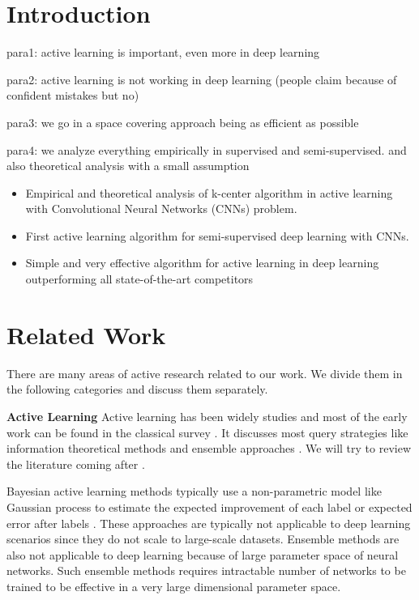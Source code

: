 \documentclass{article}
\begin{document}
\section{Introduction}
para1: active learning is important, even more in deep learning

para2: active learning is not working in deep learning (people claim because of confident mistakes but no)

para3: we go in a space covering approach being as efficient as possible

para4: we analyze everything empirically in supervised and semi-supervised. and also theoretical analysis with a small assumption

\begin{itemize}
\item Empirical and theoretical analysis of k-center algorithm in active learning with Convolutional Neural Networks (CNNs) problem.
\item First active learning algorithm for semi-supervised deep learning with CNNs.
\item Simple and very effective algorithm for active learning in deep learning outperforming all state-of-the-art competitors
\end{itemize}

\clearpage
\section{Related Work}
There are many areas of active research related to our work. We divide them in the following categories and discuss them separately. 

\noindent\textbf{Active Learning}
Active learning has been widely studies and most of the early work can be found in the classical survey \cite{settles2010active}. It discusses most query strategies like information theoretical methods \cite{mackay1992information} and ensemble approaches \cite{mccallumzy1998employing, freund1997selective}. We will try to review the literature coming after \cite{settles2010active}. 

Bayesian active learning methods typically use a non-parametric model like Gaussian process to estimate the expected improvement of each label \cite{kapoor2007active} or expected error after labels \cite{roy2001toward}. These approaches are typically not applicable to deep learning scenarios since they do not scale to large-scale datasets. Ensemble methods are also not applicable to deep learning because of large parameter space of neural networks. Such ensemble methods requires intractable number of networks to be trained to be effective in a very large dimensional parameter space.
\end{document}
